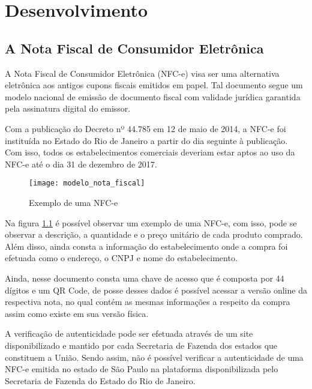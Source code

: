 \chapter{Desenvolvimento}

\section{A Nota Fiscal de Consumidor Eletrônica}

A Nota Fiscal de Consumidor Eletrônica (NFC-e) visa ser uma alternativa eletrônica aos antigos cupons fiscais emitidos em papel. Tal documento segue um modelo nacional de emissão de documento fiscal com validade jurídica garantida pela assinatura digital do emissor.

Com a publicação do Decreto nº 44.785 em 12 de maio de 2014, a NFC-e foi instituída no Estado do Rio de Janeiro a partir do dia seguinte à publicação. Com isso, todos os estabelecimentos comerciais deveriam estar aptos ao uso da NFC-e até o dia 31 de dezembro de 2017.

\begin{figure}[h]
    \centering
    \texttt{[image: modelo\_nota\_fiscal]}
    \caption{Exemplo de uma NFC-e}
    \label{modeloNfce}
\end{figure}

Na figura \ref{modeloNfce} é possível observar um exemplo de uma NFC-e, com isso, pode se observar a descrição, a quantidade e o preço unitário de cada produto comprado. Além disso, ainda consta a informação do estabelecimento onde a compra foi efetuada como o endereço, o CNPJ e nome do estabelecimento.

Ainda, nesse documento consta uma chave de acesso que é composta por 44 dígitos e um QR Code, de posse desses dados é possível acessar a versão online da respectiva nota, no qual contém as mesmas informações a respeito da compra assim como existe em sua versão física.


A verificação de autenticidade pode ser efetuada através de um site disponibilizado e mantido por cada Secretaria de Fazenda dos estados que constituem a União. Sendo assim, não é possível verificar a autenticidade de uma NFC-e emitida no estado de São Paulo na plataforma disponibilizada pelo Secretaria de Fazenda do Estado do Rio de Janeiro.

